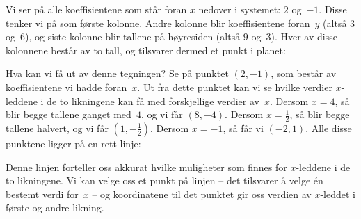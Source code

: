Vi ser på alle koeffisientene som står foran $x$ nedover i systemet:
$2$ og~$-1$.  Disse tenker vi på som første kolonne.  Andre kolonne
blir koeffisientene foran~$y$ (altså $3$ og~$6$), og siste kolonne
blir tallene på høyresiden (altså $9$ og~$3$).  Hver av disse
kolonnene består av to tall, og tilsvarer dermed et punkt i planet:
\begin{center}
\end{center}
Hva kan vi få ut av denne tegningen?  Se på punktet $(2,-1)$, som
består av koeffisientene vi hadde foran~$x$.  Ut fra dette punktet kan
vi se hvilke verdier $x$-leddene i de to likningene kan få med
forskjellige verdier av~$x$.  Dersom $x=4$, så blir begge tallene
ganget med~$4$, og vi får $(8,-4)$.  Dersom $x=\frac{1}{2}$, så blir
begge tallene halvert, og vi får $(1,-\frac{1}{2})$.  Dersom $x=-1$,
så får vi $(-2,1)$.  Alle disse punktene ligger på en rett linje:
\begin{center}
\end{center}
Denne linjen forteller oss akkurat hvilke muligheter som finnes for
$x$-leddene i de to likningene.  Vi kan velge oss et punkt på linjen
-- det tilsvarer å velge én bestemt verdi for~$x$ -- og koordinatene
til det punktet gir oss verdien av $x$-leddet i første og andre
likning.

